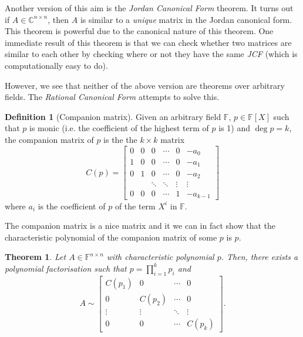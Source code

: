 \documentclass[
]{article}
\newtheorem{theorem}{Theorem}
\theoremstyle{definition}
\newtheorem{definition}{Definition}[section]
\begin{document}
Another version of this aim is the \emph{Jordan Canonical Form} theorem.
It turns out if \(A \in \mathbb{C}^{n \times n}\), then \(A\) is similar
to a \emph{unique} matrix in the Jordan canonical form. This theorem is
powerful due to the canonical nature of this theorem. One immediate
result of this theorem is that we can check whether two matrices are
similar to each other by checking where or not they have the same
\emph{JCF} (which is computationally easy to do).

However, we see that neither of the above version are theorems over
arbitrary fields. The \emph{Rational Canonical Form} attempts to solve
this.

\begin{definition} [Companion matrix]
  Given an arbitrary field \(\mathbb{F}\), \(p \in \mathbb{F}[X]\) such that 
  \(p\) is monic (i.e. the coefficient of the highest term of \(p\) is 1) and 
  \(\deg p = k\), the companion matrix of \(p\) is the the \(k \times k\) matrix 
  \[C(p) =
    \begin{bmatrix}
      0 & 0 & 0 & \cdots & 0 & -a_0 \\
      1 & 0 & 0 & \cdots & 0 & -a_1 \\
      0 & 1 & 0 & \cdots & 0 & -a_2 \\
       &  & \ddots & \ddots & \vdots & \vdots \\
      0 & 0 & 0 & \cdots & 1 & -a_{k - 1}
    \end{bmatrix}  
  \]
  where \(a_i\) is the coefficient of \(p\) of the term \(X^i\) in 
  \(\mathbb{F}\).
\end{definition}

The companion matrix is a nice matrix and it we can in fact show that
the characteristic polynomial of the companion matrix of some \(p\) is
\(p\).

\begin{theorem}
  Let \(A \in \mathbb{F}^{n \times n}\) with characteristic polynomial \(p\). 
  Then, there exists a polynomial factorisation such that 
  \(p = \prod_{i = 1}^k p_i\) and
  \[ A \sim
    \begin{bmatrix}
      C(p_1) & 0 & \cdots & 0 \\
      0 & C(p_2) & \cdots & 0 \\
      \vdots & \vdots & \ddots & \vdots \\
      0 & 0 & \cdots & C(p_k)
    \end{bmatrix}.
  \]
\end{theorem}
\end{document}
